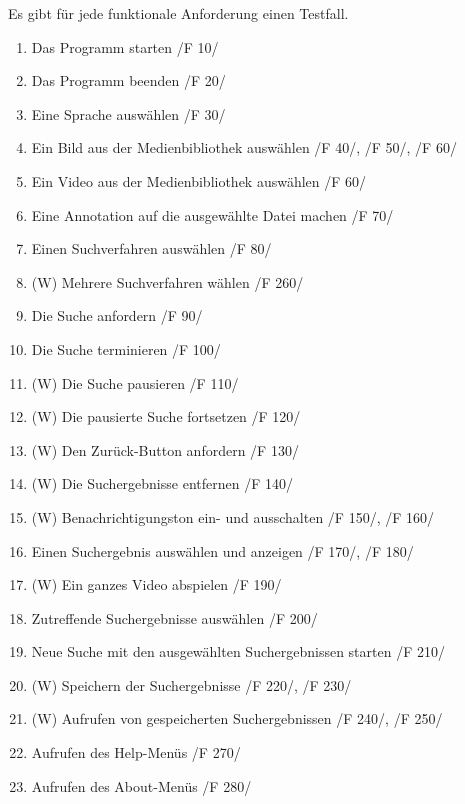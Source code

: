 	Es gibt für jede funktionale Anforderung einen Testfall.
\begin{enumerate} [label=\bfseries /TF \arabic*0/]
	\item Das Programm starten /F 10/
	\item Das Programm beenden /F 20/
	\item Eine Sprache auswählen /F 30/
	\item Ein Bild aus der Medienbibliothek auswählen /F 40/, /F 50/, /F 60/
	\item Ein Video aus der Medienbibliothek auswählen /F 60/
	\item Eine Annotation auf die ausgewählte Datei machen /F 70/
	\item Einen Suchverfahren auswählen /F 80/
	\item (W) Mehrere Suchverfahren wählen /F 260/
	\item Die Suche anfordern /F 90/
	\item Die Suche terminieren /F 100/
	\item (W) Die Suche pausieren /F 110/
	\item (W) Die pausierte Suche fortsetzen /F 120/
	\item (W) Den Zurück-Button anfordern /F 130/
	\item (W) Die Suchergebnisse entfernen /F 140/
	\item (W) Benachrichtigungston ein- und ausschalten /F 150/, /F 160/
	\item Einen Suchergebnis auswählen und anzeigen /F 170/, /F 180/
	\item (W) Ein ganzes Video abspielen /F 190/
	\item Zutreffende Suchergebnisse auswählen /F 200/
	\item Neue Suche mit den ausgewählten Suchergebnissen starten /F 210/
	\item (W) Speichern der Suchergebnisse /F 220/, /F 230/
	\item (W) Aufrufen von gespeicherten Suchergebnissen /F 240/, /F 250/
	\item Aufrufen des Help-Menüs /F 270/
	\item Aufrufen des About-Menüs /F 280/
\end{enumerate}